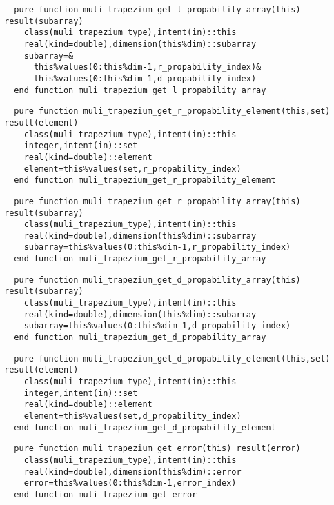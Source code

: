 \begin{Verbatim}
  pure function muli_trapezium_get_l_propability_array(this) result(subarray)
    class(muli_trapezium_type),intent(in)::this
    real(kind=double),dimension(this%dim)::subarray
    subarray=&
      this%values(0:this%dim-1,r_propability_index)&
     -this%values(0:this%dim-1,d_propability_index)
  end function muli_trapezium_get_l_propability_array
\end{Verbatim}

\begin{Verbatim}
  pure function muli_trapezium_get_r_propability_element(this,set) result(element)
    class(muli_trapezium_type),intent(in)::this
    integer,intent(in)::set
    real(kind=double)::element
    element=this%values(set,r_propability_index)
  end function muli_trapezium_get_r_propability_element
\end{Verbatim}

\begin{Verbatim}
  pure function muli_trapezium_get_r_propability_array(this) result(subarray)
    class(muli_trapezium_type),intent(in)::this
    real(kind=double),dimension(this%dim)::subarray
    subarray=this%values(0:this%dim-1,r_propability_index)
  end function muli_trapezium_get_r_propability_array
\end{Verbatim}

\begin{Verbatim}
  pure function muli_trapezium_get_d_propability_array(this) result(subarray)
    class(muli_trapezium_type),intent(in)::this
    real(kind=double),dimension(this%dim)::subarray
    subarray=this%values(0:this%dim-1,d_propability_index)
  end function muli_trapezium_get_d_propability_array
\end{Verbatim}

\begin{Verbatim}
  pure function muli_trapezium_get_d_propability_element(this,set) result(element)
    class(muli_trapezium_type),intent(in)::this
    integer,intent(in)::set
    real(kind=double)::element
    element=this%values(set,d_propability_index)
  end function muli_trapezium_get_d_propability_element
\end{Verbatim}

\begin{Verbatim}
  pure function muli_trapezium_get_error(this) result(error)
    class(muli_trapezium_type),intent(in)::this
    real(kind=double),dimension(this%dim)::error
    error=this%values(0:this%dim-1,error_index)
  end function muli_trapezium_get_error
\end{Verbatim}

